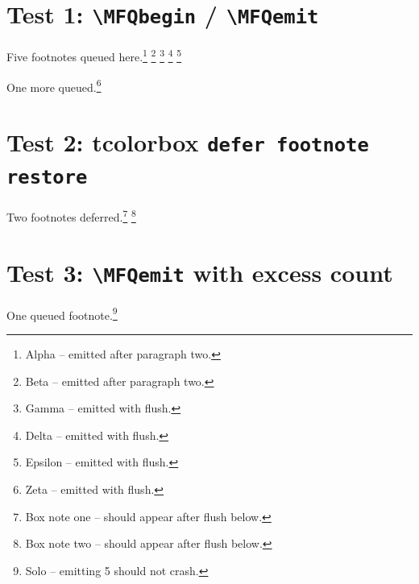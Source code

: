 \documentclass[12pt]{memoir}
\begin{document}
\section*{Test 1: \texttt{\textbackslash MFQbegin} / \texttt{\textbackslash MFQemit}}

\MFQbegin
\lipsum[1]
Five footnotes queued here.\footnote{Alpha -- emitted after paragraph two.}%
\footnote{Beta -- emitted after paragraph two.}%
\footnote{Gamma -- emitted with flush.}%
\footnote{Delta -- emitted with flush.}%
\footnote{Epsilon -- emitted with flush.}


\lipsum[2] One more queued.\footnote{Zeta -- emitted with flush.}

\MFQflush %

\lipsum[3]

\clearpage

\section*{Test 2: tcolorbox \texttt{defer footnote restore}}

\begin{tcolorbox}
\lipsum[4]
Two footnotes deferred.\footnote{Box note one -- should appear after flush below.}%
\footnote{Box note two -- should appear after flush below.}
\end{tcolorbox}

\lipsum[5]

\MFQflush %

\lipsum[6]

\clearpage

\section*{Test 3: \texttt{\textbackslash MFQemit} with excess count}

\MFQbegin
\lipsum[7] One queued footnote.\footnote{Solo -- emitting 5 should not crash.}

\lipsum[8]
\end{document}
